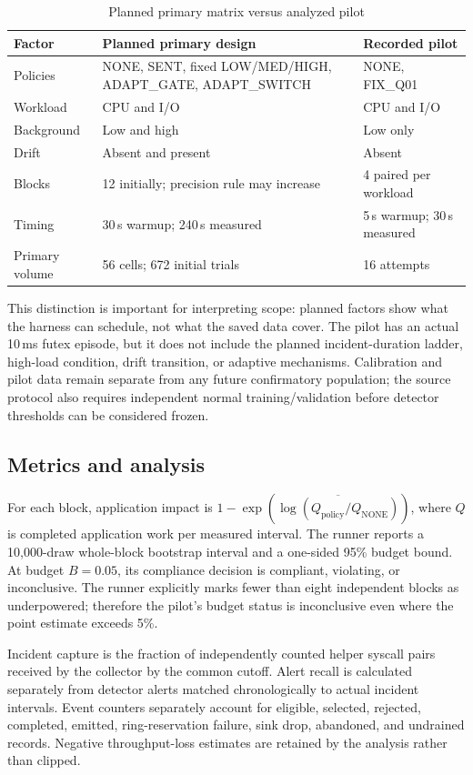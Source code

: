 \documentclass[conference]{IEEEtran}
\begin{document}
\begin{table}[t]
\caption{Planned primary matrix versus analyzed pilot}
\label{tab:scope}
\centering
\scriptsize
\setlength{\tabcolsep}{2pt}
\begin{tabular}{@{}p{0.72in}p{1.35in}p{1.15in}@{}}
\toprule
Factor & Planned primary design & Recorded pilot\\
\midrule
Policies & NONE, SENT, fixed LOW/MED/HIGH, ADAPT\_GATE, ADAPT\_SWITCH & NONE, FIX\_Q01\\
Workload & CPU and I/O & CPU and I/O\\
Background & Low and high & Low only\\
Drift & Absent and present & Absent\\
Blocks & 12 initially; precision rule may increase & 4 paired per workload\\
Timing & 30\,s warmup; 240\,s measured & 5\,s warmup; 30\,s measured\\
Primary volume & 56 cells; 672 initial trials & 16 attempts\\
\bottomrule
\end{tabular}
\end{table}

This distinction is important for interpreting scope: planned factors show what the harness can schedule, not what the saved data cover. The pilot has an actual 10\,ms futex episode, but it does not include the planned incident-duration ladder, high-load condition, drift transition, or adaptive mechanisms. Calibration and pilot data remain separate from any future confirmatory population; the source protocol also requires independent normal training/validation before detector thresholds can be considered frozen.

\subsection{Metrics and analysis}
For each block, application impact is \(1-\exp(\overline{\log(Q_{\mathrm{policy}}/Q_{\mathrm{NONE}})})\), where \(Q\) is completed application work per measured interval. The runner reports a 10,000-draw whole-block bootstrap interval and a one-sided 95\% budget bound. At budget \(B=0.05\), its compliance decision is compliant, violating, or inconclusive. The runner explicitly marks fewer than eight independent blocks as underpowered; therefore the pilot's budget status is inconclusive even where the point estimate exceeds 5\%.

Incident capture is the fraction of independently counted helper syscall pairs received by the collector by the common cutoff. Alert recall is calculated separately from detector alerts matched chronologically to actual incident intervals. Event counters separately account for eligible, selected, rejected, completed, emitted, ring-reservation failure, sink drop, abandoned, and undrained records. Negative throughput-loss estimates are retained by the analysis rather than clipped.
\end{document}
